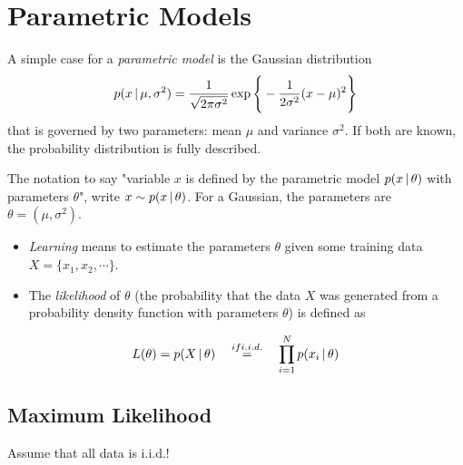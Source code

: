 \section{Parametric Models}
	A simple case for a \emph{parametric model} is the Gaussian distribution
	\begin{equation}
		p(x \,\vert\, \mu, \sigma^2) = \frac{1}{\sqrt{2\pi\sigma^2}} \exp\Bigg\{ -\frac{1}{2\sigma^2} (x - \mu)^2 \Bigg\}
	\end{equation}
	that is governed by two parameters: mean \(\mu\) and variance \(\sigma^2\). If both are known, the probability distribution is fully described.

	The notation to say "variable \(x\) is defined by the parametric model \( p(x \,\vert\, \theta) \) with parameters \(\theta\)", write \( x \sim p(x \,\vert\, \theta) \). For a Gaussian, the parameters are \( \theta = (\mu, \sigma^2) \).

	\begin{itemize}
		\item \emph{Learning} means to estimate the parameters \(\theta\) given some training data \( X = \{ x_1, x_2, \cdots \} \).
		\item The \emph{likelihood} of \(\theta\) (the probability that the data \(X\) was generated from a probability density function with parameters \(\theta\)) is defined as
	\end{itemize}
	\begin{equation}
		L(\theta) = p(X \,\vert\, \theta) \quad\overset{if i.i.d.}{=}\quad \prod_{i = 1}^{N} p(x_i \,\vert\, \theta)
	\end{equation}

	\subsection{Maximum Likelihood}
		Assume that all data is i.i.d.!

